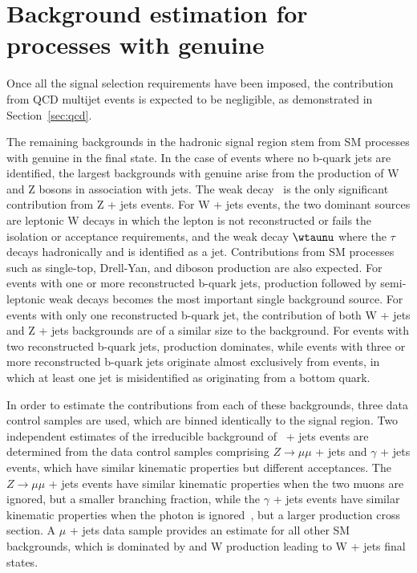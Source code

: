 \clearpage
\section{Background estimation for processes with genuine \texorpdfstring{\met}{MET}\label{sec:backgrounds}}

Once all the signal selection requirements have been imposed, the
contribution from QCD multijet events is expected to be negligible, as
demonstrated in Section~\ref{sec:qcd}.

The remaining backgrounds in the hadronic signal region stem from SM
processes with genuine \met in the final state.  In the case of events
where no b-quark jets are identified, the largest backgrounds with
genuine \met arise from the production of W and Z bosons in
association with jets. The weak decay \znunu\ is the only significant
contribution from Z + jets events. For W + jets events, the two
dominant sources are leptonic W decays in which the lepton is not
reconstructed or fails the isolation or acceptance requirements, and
the weak decay $\wtaunu$ where the $\tau$ decays hadronically and is
identified as a jet. Contributions from SM processes such as
single-top, Drell-Yan, and diboson production are also expected. For
events with one or more reconstructed b-quark jets, \ttbar production
followed by semi-leptonic weak decays becomes the most important
single background source. For events with only one reconstructed
b-quark jet, the contribution of both W + jets and Z + jets
backgrounds are of a similar size to the \ttbar background.  For
events with two reconstructed b-quark jets, \ttbar production
dominates, while events with three or more reconstructed b-quark jets
originate almost exclusively from \ttbar events, in which at least one
jet is misidentified as originating from a bottom quark.

In order to estimate the contributions from each of these backgrounds,
three data control samples are used, which are binned identically to
the signal region. Two independent estimates of the irreducible
background of \znunu\ + jets events are determined from the data
control samples comprising $Z\rightarrow\mu\mu$ + jets and $\gamma$ +
jets events, which have similar kinematic properties but different
acceptances. The $Z\rightarrow\mu\mu$ + jets events have similar
kinematic properties when the two muons are ignored, but a smaller
branching fraction, while the $\gamma$ + jets events have similar
kinematic properties when the photon is
ignored~\cite{PAS-SUS-08-002,Bern:2011pa}, but a larger production
cross section. A $\mu$ + jets data sample provides an estimate for all
other SM backgrounds, which is dominated by \ttbar and W production
leading to W + jets final states.

